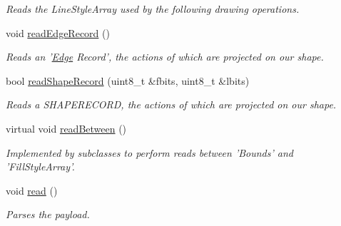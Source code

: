 \begin{DoxyCompactItemize}
\begin{DoxyCompactList}\small\item\em Reads the Line\+Style\+Array used by the following drawing operations. \end{DoxyCompactList}\item 
void \hyperlink{classjswf_1_1flash_1_1tags_1_1_define_shape_tag_a45fe7622315ca4e691ef877fda965186}{read\+Edge\+Record} ()
\begin{DoxyCompactList}\small\item\em Reads an '\hyperlink{structjswf_1_1flash_1_1_edge}{Edge} Record', the actions of which are projected on our shape. \end{DoxyCompactList}\item 
bool \hyperlink{classjswf_1_1flash_1_1tags_1_1_define_shape_tag_ad09ba2dc46cbd90f7b8db0cb2401a9ef}{read\+Shape\+Record} (uint8\+\_\+t \&fbits, uint8\+\_\+t \&lbits)
\begin{DoxyCompactList}\small\item\em Reads a {\ttfamily S\+H\+A\+P\+E\+R\+E\+C\+O\+R\+D}, the actions of which are projected on our shape. \end{DoxyCompactList}\item 
\hypertarget{classjswf_1_1flash_1_1tags_1_1_define_shape_tag_a07ce111b115f578e0581b614dcdbd271}{virtual void \hyperlink{classjswf_1_1flash_1_1tags_1_1_define_shape_tag_a07ce111b115f578e0581b614dcdbd271}{read\+Between} ()}\label{classjswf_1_1flash_1_1tags_1_1_define_shape_tag_a07ce111b115f578e0581b614dcdbd271}

\begin{DoxyCompactList}\small\item\em Implemented by subclasses to perform reads between 'Bounds' and 'Fill\+Style\+Array'. \end{DoxyCompactList}\item 
\hypertarget{classjswf_1_1flash_1_1tags_1_1_define_shape_tag_a8a4139f2cb171623771104c2641e748c}{void \hyperlink{classjswf_1_1flash_1_1tags_1_1_define_shape_tag_a8a4139f2cb171623771104c2641e748c}{read} ()}\label{classjswf_1_1flash_1_1tags_1_1_define_shape_tag_a8a4139f2cb171623771104c2641e748c}

\begin{DoxyCompactList}\small\item\em Parses the payload. \end{DoxyCompactList}\end{DoxyCompactItemize}
